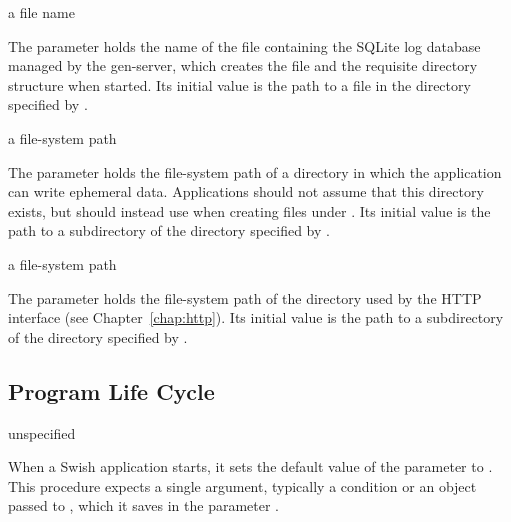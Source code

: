 \begin{parameter}
\end{parameter}
\hasvalue{} a file name

The  parameter holds the name of the file containing the SQLite
log database managed by the  gen-server, which creates the file
and the requisite directory structure when started.
Its initial value is the path to a  file in the directory
specified by .

\begin{parameter}
\end{parameter}
\hasvalue{} a file-system path

The  parameter holds the file-system path of a directory
in which the application can write ephemeral data.
Applications should not assume that this directory exists, but should
instead use  when creating files under .
Its initial value is the path to a  subdirectory of
the directory specified by .

\begin{parameter}
\end{parameter}
\hasvalue{} a file-system path

The  parameter holds the file-system path of the directory
used by the HTTP interface (see Chapter~\ref{chap:http}).
Its initial value is the path to a  subdirectory of
the directory specified by .

\subsection{Program Life Cycle}

\begin{procedure}
\end{procedure}
\returns{} unspecified

When a Swish application starts, it sets the default value of the
 parameter to .
This procedure expects a single argument, typically a condition or an object
passed to , which it saves in the parameter .

